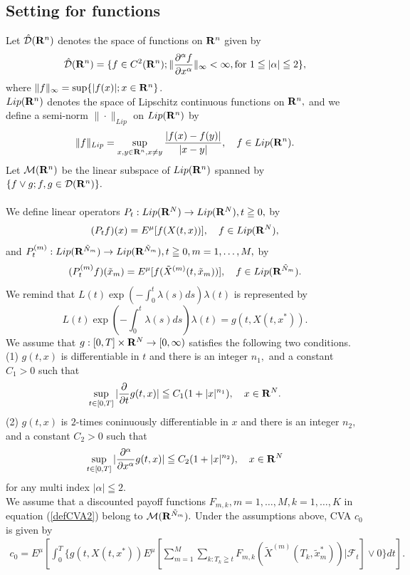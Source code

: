\documentclass[12pt]{article}
\begin{document}
\subsection{Setting for functions}
Let $\hat{{\cal D}}({\bf R}^n)$ denotes the space of functions on ${\bf R}^n$ given by
 $$\hat{{\cal D}}({\bf R}^n) =\{ f \in C^2({\bf R}^n); \|\frac{\partial^{\alpha}f}{\partial x^{\alpha}}\|_{\infty} <\infty, \text{for  } 1 \leqq |\alpha| \leqq 2 \},$$
 where $\|f\|_{\infty}=\sup \{|f(x)|; x\in {\bf R}^n\}$.\\
${Lip}({\bf R}^n)$ denotes the space of Lipschitz continuous functions on ${\bf R}^n,$  and
we define a semi-norm $\|\cdot \|_{Lip}$ on $Lip({\bf R}^n)$ by
$$\|f\|_{{Lip}}=\sup_{x,y\in {\bf R}^n, x \neq y} \frac{|f(x)-f(y)|}{|x-y|},
\quad f\in {Lip}({\bf R}^n).$$
Let ${\cal M}({\bf R}^n)$ be the linear subspace of ${Lip}({\bf R}^n)$  spanned by
$\{f \vee g;  f, g \in {\cal D}({\bf R}^n)\}.$\\
\\
We define linear operators 
$P_{t}:{Lip}({\bf R}^N) \to {Lip}({\bf R}^N), t \geqq 0,$ by
$$
(P_{t}f)(x) = E^{\mu}[f(X(t,x))], \quad f\in {Lip}({\bf R}^N),
$$
and $P^{(m)}_{t}:{Lip}({\bf R}^{\tilde{N}_m}) \to {Lip}({\bf R}^{\tilde{N}_m}), t \geqq 0 , m=1, \ldots,M,$ by
$$
(P^{(m)}_{t}f)(\tilde{x}_m) = E^{\mu}[f(\tilde{X}^{(m)}(t,\tilde{x}_m))], \quad f \in {Lip}({\bf R}^{\tilde{N}_m}).
$$
We remind that $L(t)\exp(-\int_0^t\lambda(s)ds)\lambda(t) $ is represented by
$$
L(t)\exp(-\int_0^t\lambda(s)ds)\lambda(t) = g(t, X(t,x^*)).
$$
We assume that $g: [0,T] \times {\bf R}^N \to [0,\infty)$ satisfies the following two conditions.\\
(1) $g(t,x)$ is differentiable in $t$ and there is an integer $n_1,$ and a constant $C_1 >0$ such that
$$\sup_{t\in[0,T]}| \frac{\partial}{\partial t}g(t,x)|  \leqq C_1(1+|x|^{n_1})
,\quad x \in {\bf R}^N.$$
(2) $g(t,x)$ is $2$-times coninuously differentiable in $x$ and there is an integer $n_2,$ and a constant $C_2 >0$ such that
$$
\sup_{t\in[0,T]} |\frac{\partial^{\alpha}}{\partial x^{\alpha}}g(t,x)| \leqq C_2(1+|x|^{n_2}),\quad x \in {\bf R}^N
$$
for any multi index $|\alpha|\leqq 2.$
\\
We assume that a discounted payoff functions $F_{m,k}, m=1,\ldots, M, k=1,\ldots,K$ in equation (\ref{defCVA2}) 
belong to ${\cal M}({\bf R}^{\tilde{N}_m}).$
Under the assumptions above, CVA $c_0$ is given by 
\begin{align}
c_0 = E^{\mu}[\int_{0}^T \{ g(t,X(t,x^*)) 
E^{\mu}[ \sum_{m=1}^M \sum_{k:T_k\geqq t} F_{m,k}(\tilde{X}^{(m)}(T_k, \tilde{x}^*_m)) |\mathcal{F}_t] \vee0\}dt ].
\end{align}
\end{document}
